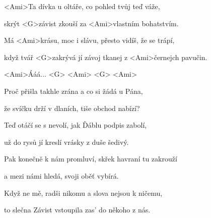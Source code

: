 

\zs
<Ami>Ta dívka u oltáře, co pohled tvůj teď váže,

skrýt <G>závist zkouší za <Ami>vlastním bohatstvím.

Má <Ami>krásu, moc i slávu, přesto vidíš, že se trápí,

když tvář <G>zakrývá jí závoj tkanej z <Ami>černejch pavučin.
\ks

\zr
<Ami>Ááá... <G> <Ami> <G> <Ami>
\kr

\zs
Proč přišla takhle zrána a co si žádá u Pána,

že svíčku drží v dlaních, tiše obchod nabízí?

\ks


\zr \kr

\zs
{}
\ks

\zr \kr

\zs
Teď otáčí se s nevolí, jak Ďáblu podpis zabolí,

už do rysů jí kreslí vrásky z duše šedivý.

Pak konečně k nám promluví, skřek havraní tu zakrouží

a mezi námi hledá, svoji oběť vybírá.

Když ne mě, radši nikomu a slova nejsou k ničemu,

to slečna Závist vstoupila zas' do někoho z nás.
\ks

\zr \kr

\kp


